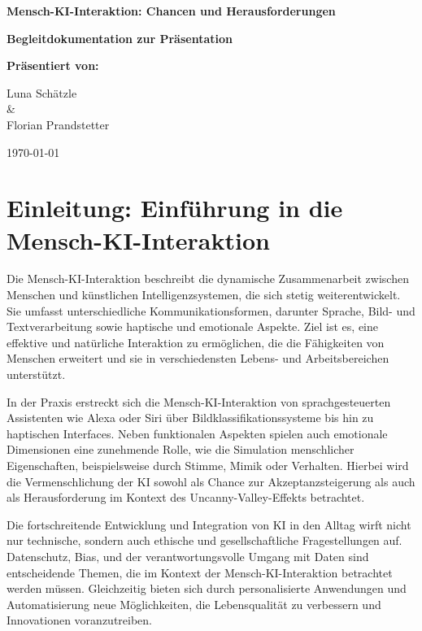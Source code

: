 \documentclass[a4paper,12pt]{article}
\begin{document}
\begin{titlepage}
    \centering
    \vspace*{1.5cm}
    \Huge\textbf{Mensch-KI-Interaktion: Chancen und Herausforderungen}

    \vspace{1cm}
    \Large\textbf{Begleitdokumentation zur Präsentation}

    \vspace{2cm}
    \textbf{Präsentiert von:}

    \vspace{0.5cm}
    \large
    Luna Schätzle \\ \& \\ Florian Prandstetter

    \vfill
    \large \today
\end{titlepage}

\tableofcontents
\newpage

\section{Einleitung: Einführung in die Mensch-KI-Interaktion}

Die Mensch-KI-Interaktion beschreibt die dynamische Zusammenarbeit zwischen Menschen und künstlichen Intelligenzsystemen, die sich stetig weiterentwickelt. Sie umfasst unterschiedliche Kommunikationsformen, darunter Sprache, Bild- und Textverarbeitung sowie haptische und emotionale Aspekte. Ziel ist es, eine effektive und natürliche Interaktion zu ermöglichen, die die Fähigkeiten von Menschen erweitert und sie in verschiedensten Lebens- und Arbeitsbereichen unterstützt.

In der Praxis erstreckt sich die Mensch-KI-Interaktion von sprachgesteuerten Assistenten wie Alexa oder Siri über Bildklassifikationssysteme bis hin zu haptischen Interfaces. Neben funktionalen Aspekten spielen auch emotionale Dimensionen eine zunehmende Rolle, wie die Simulation menschlicher Eigenschaften, beispielsweise durch Stimme, Mimik oder Verhalten. Hierbei wird die Vermenschlichung der KI sowohl als Chance zur Akzeptanzsteigerung als auch als Herausforderung im Kontext des Uncanny-Valley-Effekts betrachtet.

Die fortschreitende Entwicklung und Integration von KI in den Alltag wirft nicht nur technische, sondern auch ethische und gesellschaftliche Fragestellungen auf. Datenschutz, Bias, und der verantwortungsvolle Umgang mit Daten sind entscheidende Themen, die im Kontext der Mensch-KI-Interaktion betrachtet werden müssen. Gleichzeitig bieten sich durch personalisierte Anwendungen und Automatisierung neue Möglichkeiten, die Lebensqualität zu verbessern und Innovationen voranzutreiben.
\end{document}
